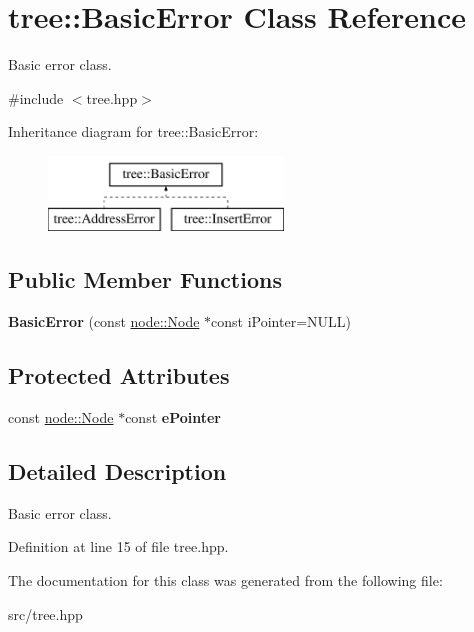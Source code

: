 \hypertarget{classtree_1_1BasicError}{\section{tree\-:\-:Basic\-Error Class Reference}
\label{classtree_1_1BasicError}
}


Basic error class.  




{\ttfamily \#include $<$tree.\-hpp$>$}

Inheritance diagram for tree\-:\-:Basic\-Error\-:\begin{figure}[H]
\begin{center}
\leavevmode
\includegraphics[height=2.000000cm]{classtree_1_1BasicError}
\end{center}
\end{figure}
\subsection*{Public Member Functions}
\begin{DoxyCompactItemize}
\item 
\hypertarget{classtree_1_1BasicError_ae973255633ffda1f9e05043683c3114e}{{\bfseries Basic\-Error} (const \hyperlink{classnode_1_1Node}{node\-::\-Node} $\ast$const i\-Pointer=N\-U\-L\-L)}\label{classtree_1_1BasicError_ae973255633ffda1f9e05043683c3114e}

\end{DoxyCompactItemize}
\subsection*{Protected Attributes}
\begin{DoxyCompactItemize}
\item 
\hypertarget{classtree_1_1BasicError_a5f85bebe161925ca7e059c4a905f7ac4}{const \hyperlink{classnode_1_1Node}{node\-::\-Node} $\ast$const {\bfseries e\-Pointer}}\label{classtree_1_1BasicError_a5f85bebe161925ca7e059c4a905f7ac4}

\end{DoxyCompactItemize}


\subsection{Detailed Description}
Basic error class. 

Definition at line 15 of file tree.\-hpp.



The documentation for this class was generated from the following file\-:\begin{DoxyCompactItemize}
\item 
src/tree.\-hpp\end{DoxyCompactItemize}
